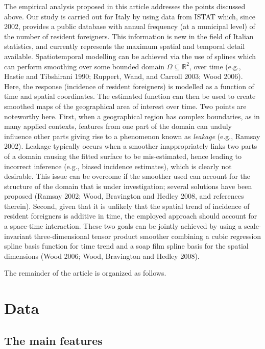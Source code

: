 \documentclass[10pt] {article}
\theoremstyle{definition}
\theoremstyle{plain}
\begin{document}
The empirical analysis proposed in this article addresses the points discussed above. Our study is carried out for Italy by using data from ISTAT which, since 2002, provides a public database with annual frequency (at a municipal level) of the number of resident foreigners. This information is new in the field of Italian statistics, and currently represents the maximum spatial and temporal detail available. Spatiotemporal modelling can be achieved via the use of splines which can perform smoothing over some bounded domain $\Omega\subseteq\mathbb{R}^2$, over time (e.g., Hastie and Tibshirani 1990; Ruppert, Wand, and Carroll 2003; Wood 2006). Here, the response (incidence of resident foreigners) is modelled as a function of time and spatial coordinates. The estimated function can then be used to create smoothed maps of the geographical area of interest over time. Two points are noteworthy here. First, when a geographical region has complex boundaries, as in many applied contexts, features from one part of the domain can unduly influence other parts giving rise to a phenomenon known as \textit{leakage} (e.g., Ramsay 2002). Leakage typically occurs when a smoother inappropriately links two parts of a domain causing the fitted surface to be mis-estimated, hence leading to incorrect inference (e.g., biased incidence estimates), which is clearly not desirable. This issue can be overcome if the smoother used can account for the structure of the domain that is under investigation; several solutions have been proposed (Ramsay 2002; Wood, Bravington and Hedley 2008, and references therein). Second, given that it is unlikely that the spatial trend of incidence of resident foreigners is additive in time, the employed approach should account for a space-time interaction. These two goals can be jointly achieved by using a scale-invariant three-dimensional tensor product smoother combining a cubic regression spline basis function for time trend and a soap film spline basis for the spatial dimensions (Wood 2006; Wood, Bravington and Hedley 2008).

The remainder of the article is organized as follows.


\section{Data \label{DAT}}

\subsection{The main features \label{SDC}}
\end{document}

